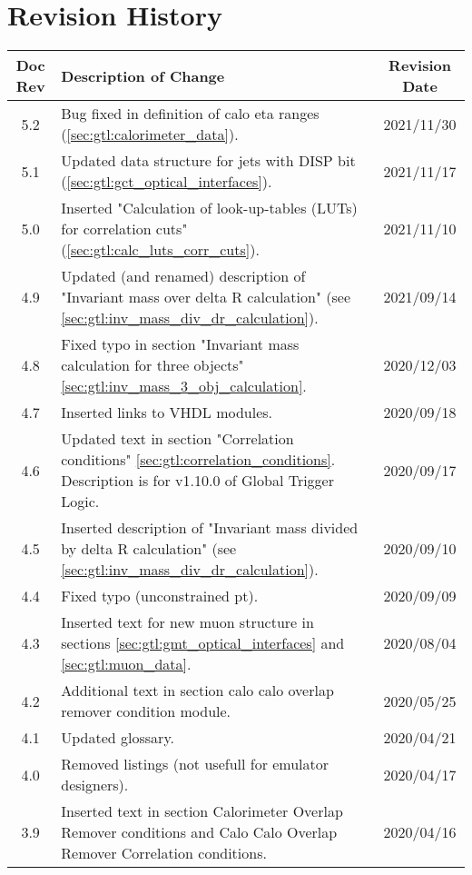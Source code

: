 \section*{Revision History}
\label{sec:revision_history}

\begin{longtable}{|c|p{}|c|}
\hline
Doc Rev & Description of Change & Revision Date\\
\hline
\hline
\endhead
5.2 & Bug fixed in definition of calo eta ranges (\ref{sec:gtl:calorimeter_data}). & 2021/11/30\\
5.1 & Updated data structure for jets with DISP bit (\ref{sec:gtl:gct_optical_interfaces}). & 2021/11/17\\
5.0 & Inserted "Calculation of look-up-tables (LUTs) for correlation cuts" (\ref{sec:gtl:calc_luts_corr_cuts}). & 2021/11/10\\
4.9 & Updated (and renamed) description of "Invariant mass over delta R calculation" (see \ref{sec:gtl:inv_mass_div_dr_calculation}). & 2021/09/14\\
4.8 & Fixed typo in section "Invariant mass calculation for three objects" \ref{sec:gtl:inv_mass_3_obj_calculation}. & 2020/12/03\\
4.7 & Inserted links to VHDL modules. & 2020/09/18\\
4.6 & Updated text in section "Correlation conditions" \ref{sec:gtl:correlation_conditions}. Description is for v1.10.0 of Global Trigger Logic. & 2020/09/17\\
4.5 & Inserted description of "Invariant mass divided by delta R calculation" (see \ref{sec:gtl:inv_mass_div_dr_calculation}). & 2020/09/10\\
4.4 & Fixed typo (unconstrained pt). & 2020/09/09\\
4.3 & Inserted text for new muon structure in sections \ref{sec:gtl:gmt_optical_interfaces} and \ref{sec:gtl:muon_data}. & 2020/08/04\\
4.2 & Additional text in section calo calo overlap remover condition module. & 2020/05/25\\
4.1 & Updated glossary. & 2020/04/21\\
4.0 & Removed listings (not usefull for emulator designers). & 2020/04/17\\
3.9 & Inserted text in section Calorimeter Overlap Remover conditions and Calo Calo Overlap Remover Correlation conditions. & 2020/04/16\\

\end{longtable}
